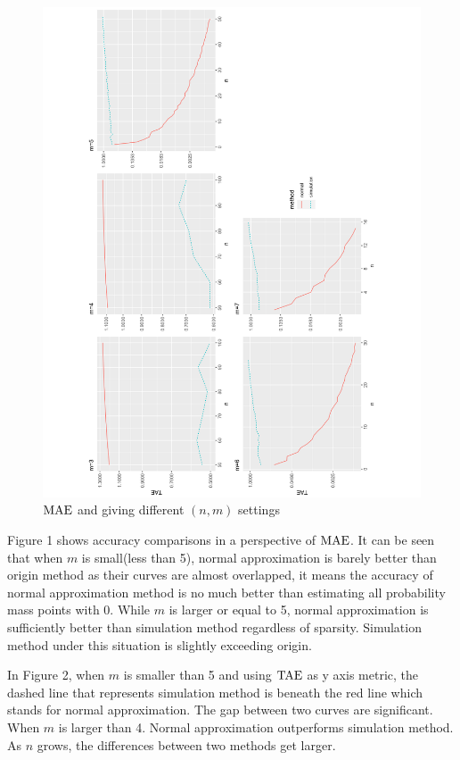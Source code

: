\documentclass[12pt]{article}
\newcommand{\TAE}{{\rm TAE}}
\newcommand{\MAE}{{\rm MAE}}
\begin{document}
\begin{figure}[h]
	\centering
	\includegraphics[angle=-90,origin=c,scale=0.5]{figures/tae_plot.pdf}
	\caption{$\MAE$ and giving different $(n,m)$ settings}
\end{figure}


Figure 1 shows accuracy comparisons in a perspective of $\MAE$. It can be seen that when $m$ is small(less than 5), normal approximation is barely better than origin method as their curves are almost overlapped, it means the accuracy of normal approximation method is no much better than estimating all probability mass points with 0. While $m$ is larger or equal to 5, normal approximation is sufficiently better than simulation method regardless of sparsity. Simulation method under this situation is slightly exceeding origin.

In Figure 2, when $m$ is smaller than 5 and using $\TAE$ as y axis metric, the dashed line that represents simulation method is beneath the red line which stands for normal approximation. The gap between two curves are significant. When $m$ is larger than 4. Normal approximation outperforms simulation method. As $n$ grows, the differences between two methods get larger.
\end{document}
